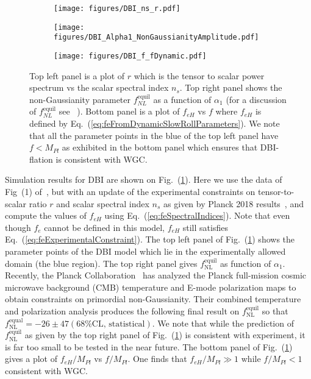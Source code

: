 \documentclass[12pt]{article}
\begin{document}
\begin{figure}
  \centering
  \begin{subfigure}{0.45 \textwidth}
    \texttt{[image: figures/DBI\_ns\_r.pdf]}
  \end{subfigure}
  \begin{subfigure}{0.45 \textwidth}
    \texttt{[image: figures/DBI\_Alpha1\_NonGaussianityAmplitude.pdf]}
  \end{subfigure}
  \begin{subfigure}{0.45 \textwidth}
    \texttt{[image: figures/DBI\_f\_fDynamic.pdf]}
  \end{subfigure}
  \caption{\protect
    Top left panel is a plot of $r$ which is the tensor to scalar power spectrum vs the scalar spectral index $n_s$.
    Top right panel shows the non-Gaussianity parameter $f_{NL}^\text{equil}$ as a function of $\alpha_1$ (for a discussion of $f_{NL}^\text{equil}$ see ~\cite{Nath:2018xxe}).
    Bottom panel is a plot of $f_{eH}$ vs $f$ where $f_{eH}$ is defined by Eq.~(\ref{eq:feFromDynamicSlowRollParameters}).
    We note that all the parameter points in the blue of the top left panel have $f < M_{Pl}$ as exhibited in the bottom panel which ensures that DBI-flation is consistent with WGC.
  } \label{fig:DBI}
\end{figure}

Simulation results for DBI are shown on Fig.~(\ref{fig:DBI}).
Here we use the data of Fig~(1) of~\cite{Nath:2018xxe}, but with an update of the experimental constraints on tensor-to-scalar ratio $r$ and scalar spectral index $n_s$ as given by Planck 2018 results~\cite{Akrami:2018odb}, and compute the values of $f_{eH}$ using Eq.~(\ref{eq:feSpectralIndices}).
Note that even though $f_e$ cannot be defined in this model, $f_{eH}$ still satisfies Eq.~(\ref{eq:feExperimentalConstraint}).
The top left panel of Fig.~(\ref{fig:DBI}) shows the parameter points of the DBI model which lie in the experimentally allowed domain (the blue region).
The top right panel gives $f^{\text{equil}}_{\text{NL}}$ as function of $\alpha_1$.
Recently, the Planck Collaboration~\cite{Akrami:2019izv} has analyzed the Planck full-mission cosmic microwave background (CMB) temperature and E-mode polarization maps to obtain constraints on primordial non-Gaussianity.
Their combined temperature and polarization analysis produces the following final result on $f^{\text{equil}}_{\text{NL}}$ so that $f^{\text{equal}}_{\text{NL}} = -26 \pm 47 \left(68 \% \text{CL, statistical}\right)$.
We note that while the prediction of $f^{\text{equil}}_{\text{NL}}$ as given by the top right panel of Fig.~(\ref{fig:DBI}) is consistent with experiment, it is far too small to be tested in the near future.
The bottom panel of Fig.~(\ref{fig:DBI}) gives a plot of $f_{eH} / M_{Pl}$ vs $f / M_{Pl}$.
One finds that $f_{eH} / M_{Pl} \gg 1$ while $f / M_{Pl} < 1$ consistent with WGC.
\end{document}
